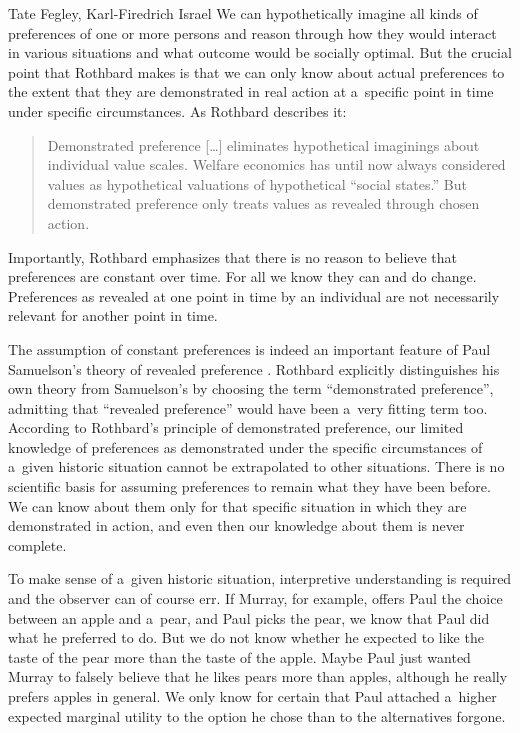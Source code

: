 \begin{artengenv2auth}{Tate Fegley, Karl-Firedrich Israel}
We can hypothetically imagine all kinds of preferences of one or more persons and reason through how they would interact in various situations and what outcome would be socially optimal. But the crucial point that Rothbard makes is that we can only know about actual preferences to the extent that they are demonstrated in real action at a~specific point in time under specific circumstances. As Rothbard 
\parencite*[][p.320]{rothbard_toward_2011} %
 describes it:



\begin{quote}
Demonstrated preference […] eliminates hypothetical imaginings about individual value scales. Welfare economics has until now always considered values as hypothetical valuations of hypothetical ``social states.'' But demonstrated preference only treats values as revealed through chosen action.
\end{quote}



Importantly, Rothbard emphasizes that there is no reason to believe that preferences are constant over time. For all we know they can and do change. Preferences as revealed at one point in time by an individual are not necessarily relevant for another point in time.



The assumption of constant preferences is indeed an important feature of Paul Samuelson's theory of revealed preference 
\parencite[][]{samuelson_empirical_1938}. %
 Rothbard explicitly distinguishes his own theory from Samuelson's by choosing the term ``demonstrated preference'', admitting that ``revealed preference'' would have been a~very fitting term too. According to Rothbard's principle of demonstrated preference, our limited knowledge of preferences as demonstrated under the specific circumstances of a~given historic situation cannot be extrapolated to other situations. There is no scientific basis for assuming preferences to remain what they have been before. We can know about them only for that specific situation in which they are demonstrated in action, and even then our knowledge about them is never complete.



To make sense of a~given historic situation, interpretive understanding is required and the observer can of course err. If Murray, for example, offers Paul the choice between an apple and a~pear, and Paul picks the pear, we know that Paul did what he preferred to do. But we do not know whether he expected to like the taste of the pear more than the taste of the apple. Maybe Paul just wanted Murray to falsely believe that he likes pears more than apples, although he really prefers apples in general. We only know for certain that Paul attached a~higher expected marginal utility to the option he chose than to the alternatives forgone.




\end{artengenv2auth}
